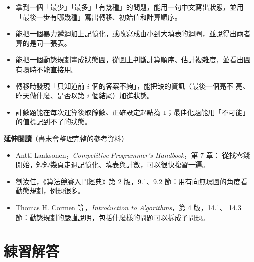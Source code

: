 \begin{itemize}
\item 拿到一個「最少」「最多」「有幾種」的問題，能用一句中文寫出狀態，並用
「最後一步有哪幾種」寫出轉移、初始值和計算順序。
\item 能把一個暴力遞迴加上記憶化，或改寫成由小到大填表的迴圈，並說得出兩者
算的是同一張表。
\item 能把一個動態規劃畫成狀態圖，從圖上判斷計算順序、估計複雜度，並看出圖
有環時不能直接用。
\item 轉移時發現「只知道前 $i$ 個的答案不夠」，能把缺的資訊（最後一個亮不
亮、昨天做什麼、是否以第 $i$ 個結尾）加進狀態。
\item 計數題能在每次運算後取餘數、正確設定起點為 $1$；最佳化題能用「不可能」
的值標記到不了的狀態。
\end{itemize}

\textbf{延伸閱讀}（書末會整理完整的參考資料）

\begin{itemize}
\item Antti Laaksonen，\textit{Competitive Programmer's Handbook}，第 7 章：
從找零錢開始，短短幾頁走過記憶化、填表與計數，可以很快複習一遍。
\item 劉汝佳，《算法競賽入門經典》第 2 版，9.1、9.2 節：用有向無環圖的角度看
動態規劃，例題很多。
\item Thomas H. Cormen 等，\textit{Introduction to Algorithms}，第 4 版，14.1、
14.3 節：動態規劃的嚴謹說明，包括什麼樣的問題可以拆成子問題。
\end{itemize}

\section*{練習解答}

